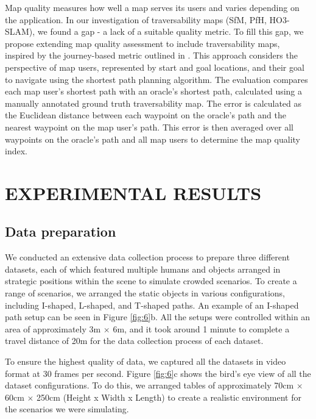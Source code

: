 \documentclass[letterpaper, 10 pt, conference]{ieeeconf}
\begin{document}
Map quality measures how well a map serves its users and varies depending on the application. In our investigation of traversability maps (SfM, PfH, HO3-SLAM), we found a gap - a lack of a suitable quality metric. To fill this gap, we propose extending map quality assessment to include traversability maps, inspired by the journey-based metric outlined in \cite{r45}. This approach considers the perspective of map users, represented by start and goal locations, and their goal to navigate using the shortest path planning algorithm. The evaluation compares each map user's shortest path with an oracle's shortest path, calculated using a manually annotated ground truth traversability map. The error is calculated as the Euclidean distance between each waypoint on the oracle's path and the nearest waypoint on the map user's path. This error is then averaged over all waypoints on the oracle's path and all map users to determine the map quality index.

\figF

\section{EXPERIMENTAL RESULTS}

\subsection{Data preparation}



We conducted an extensive data collection process to prepare three different datasets, each of which featured multiple humans and objects arranged in strategic positions within the scene to simulate crowded scenarios. To create a range of scenarios, we arranged the static objects in various configurations, including I-shaped, L-shaped, and T-shaped paths. An example of an I-shaped path setup can be seen in Figure \ref{fig:6}b. All the setups were controlled within an area of approximately 3m $\times$ 6m, and it took around 1 minute to complete a travel distance of 20m for the data collection process of each dataset.

To ensure the highest quality of data, we captured all the datasets in video format at 30 frames per second. Figure \ref{fig:6}c shows the bird's eye view of all the dataset configurations. To do this, we arranged tables of approximately 70cm $\times$ 60cm $\times$ 250cm (Height x Width x Length) to create a realistic environment for the scenarios we were simulating.
\end{document}
